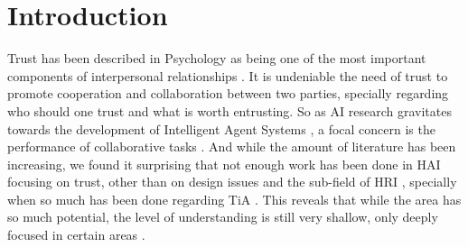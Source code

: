 \section{Introduction}
\label{sec:Introduction}

Trust has been described in Psychology as being one of the most important components of interpersonal relationships \cite{Simpson2007}. It is undeniable the need of trust to promote cooperation and collaboration between two parties, specially regarding who should one trust and what is worth entrusting. So as \ac{AI} research gravitates towards the development of Intelligent Agent Systems \cite{Russell2009a}, a focal concern is the performance of collaborative tasks \cite{Grosz1996, Allen2007}. And while the amount of literature has been increasing, we found it surprising that not enough work has been done in \ac{HAI} focusing on trust, other than on design issues \cite{Bickmore2005} and the sub-field of \ac{HRI} \cite{Goodrich2007, VandenBrule2014}, specially when so much has been done regarding \ac{TiA} \cite{Jones1997, Lee2004}. This reveals that while the area has so much potential, the level of understanding is still very shallow, only deeply focused in certain areas \cite{Granatyr2015}.

